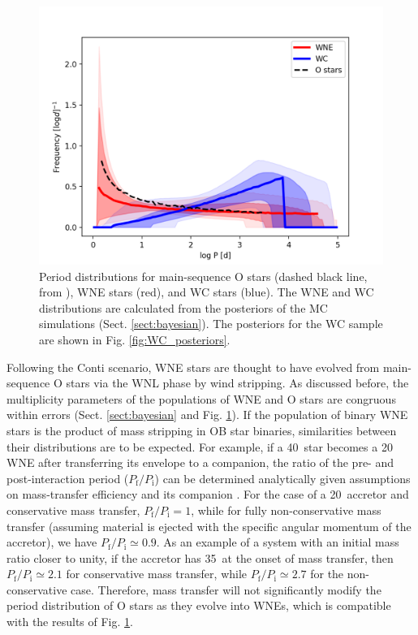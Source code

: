 \begin{figure}
    \centering
    \includegraphics[width=\textwidth]{chapters/WNE/image/PeriodDistShift.png}
    \caption{Period distributions for main-sequence O stars (dashed black line, from \citet{sana_binary_2012}), WNE stars (red), and WC stars (blue). The WNE and WC distributions are calculated from the posteriors of the MC simulations (Sect. \ref{sect:bayesian}). The posteriors for the WC sample are shown in Fig. \ref{fig:WC_posteriors}.}
    \label{fig:periodDistShift}
\end{figure}

Following the Conti scenario, WNE stars are thought to have evolved from main-sequence O stars via the WNL phase by wind stripping. As discussed before, the multiplicity parameters of the populations of WNE and O stars are congruous within errors (Sect. \ref{sect:bayesian} and Fig. \ref{fig:periodDistShift}). If the population of binary WNE stars is the product of mass stripping in OB star binaries, similarities between their distributions are to be expected. For example, if a 40\,\Msun{} star becomes a 20\,\Msun{} WNE after transferring its envelope to a companion, the ratio of the pre- and post-interaction period ($P_\mathrm{f}/P_\mathrm{i}$) can be determined analytically given assumptions on mass-transfer efficiency and its companion \citep{1997SobermanMassTransfer}. For the case of a 20\,\Msun{} accretor and conservative mass transfer, $P_\mathrm{f}/P_\mathrm{i}=1$, while for fully non-conservative mass transfer (assuming material is ejected with the specific angular momentum of the accretor), we have $P_\mathrm{f}/P_\mathrm{i}\simeq 0.9$. As an example of a system with an initial mass ratio closer to unity, if the accretor has 35\,\Msun{} at the onset of mass transfer, then $P_\mathrm{f}/P_\mathrm{i}\simeq 2.1$ for conservative mass transfer, while $P_\mathrm{f}/P_\mathrm{i}\simeq 2.7$ for the non-conservative case. Therefore, mass transfer will not significantly modify the period distribution of O stars as they evolve into WNEs, which is compatible with the results of Fig. \ref{fig:periodDistShift}.

